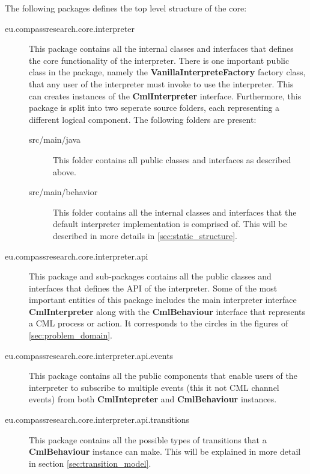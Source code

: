 \documentclass[a4paper, 10pt]{include/compassreport}   %
\begin{document}
The following packages defines the top level structure of the core:
\begin{description}

\item[eu.compassresearch.core.interpreter] This package contains all
  the internal classes and interfaces that defines the core
  functionality of the interpreter. There is one important public class
  in the package, namely the \textbf{VanillaInterpreteFactory} factory
  class, that any user of the interpreter must invoke to use the
  interpreter. This can creates instances of the \textbf{CmlInterpreter}
  interface. Furthermore, this package is split into two
  seperate source folders, each representing a different logical component. The
  following folders are present:
  \begin{description}
  \item[src/main/java] This folder contains all public classes and
    interfaces as described above.
  \item[src/main/behavior] This folder contains all the internal
    classes and interfaces that the default interpreter implementation is
    comprised of. This will be described in more details in
    \autoref{sec:static_structure}.
  \end{description}
  
\item[eu.compassresearch.core.interpreter.api] This package and
  sub-packages contains all the public classes and interfaces that
  defines the API of the interpreter. Some of the most important
  entities of this package includes the main interpreter interface
  \textbf{CmlInterpreter} along with the \textbf{CmlBehaviour} interface
  that represents a CML process or action. It corresponds to the circles
  in the figures of \autoref{sec:problem_domain}.

\item[eu.compassresearch.core.interpreter.api.events] This package
  contains all the public components that enable users of the
  interpreter to subscribe to multiple events (this it not CML
  channel events) from both \textbf{CmlIntepreter} and
  \textbf{CmlBehaviour} instances.

\item[eu.compassresearch.core.interpreter.api.transitions] This
  package contains all the possible types of transitions that a
  \textbf{CmlBehaviour} instance can make. This will be explained in
  more detail in section \ref{sec:transition_model}.


\end{description}
\end{document}
